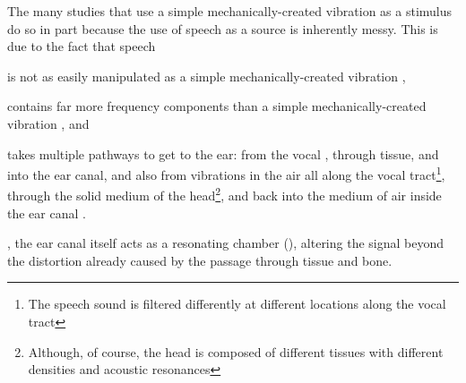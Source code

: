 The many studies that use a simple mechanically-created vibration as a stimulus do so in part because the use of speech as a source is inherently messy.  This is due to the fact that speech 
\DIFdelbegin {}\DIFdelend \begin{enumerate*}[label={\alph*)}]
  \item  is not as easily manipulated as a simple mechanically-created vibration \DIFaddbegin \DIFadd{(\mbox{%
\cite{}
}%
)}\DIFaddend ,
  \item  contains far more frequency components than a simple mechanically-created vibration \DIFaddbegin \DIFadd{(\mbox{%
\cite{}
}%
)}\DIFaddend , and 
  \item  takes multiple pathways to get to the ear: from the vocal \DIFdelbegin {}\DIFdelend \DIFaddbegin {}\DIFaddend , through tissue, and into the ear canal, and also from vibrations in the air all along the vocal tract\footnote{The speech sound is filtered differently at different locations along the vocal tract}, through the solid medium of the head\footnote{Although, of course, the head is composed of different tissues with different densities and acoustic resonances}, and back into the medium of air inside the ear canal \DIFaddbegin \DIFadd{(\mbox{%
\cite{}
}%
)}\DIFaddend .
\end{enumerate*}
% 
%
\DIFdelbegin {}\DIFdelend \DIFaddbegin {}\DIFaddend , the ear canal itself acts as a resonating chamber (\cite{rosen:91}), altering the signal beyond the distortion already caused by the passage through tissue and bone.  


